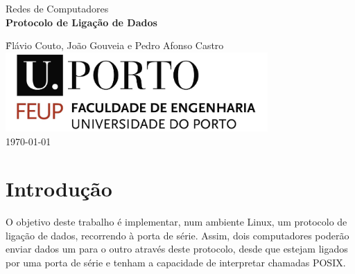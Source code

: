 \documentclass[11pt,a4paper,reqno]{article}
\numberwithin{equation}{section}
\begin{document}
\begin{titlepage}
\begin{center}
 
\vspace*{3cm}

{\Large Redes de Computadores}\\[2cm]

{\Huge \bfseries Protocolo de Liga\c{c}\~ao de Dados \\[1cm]}

{\large \^Flávio Couto, João Gouveia e Pedro Afonso Castro}\\[2cm]

\includegraphics[width=10cm]{feup_logo.jpg}\\[2cm]


{\large \today}

\end{center}
\end{titlepage}

\begin{abstract}
No âmbito da unidade curricular de Redes de Computadores, foi-nos proposta a elaboração de uma aplicação que permitia a transferência de dados entre dois computadores através da porta de série. Para tal, recorremos à implementação de duas camadas: a camada de ligação de dados e a camada da aplicação.

O nosso grupo soube compreender bem os objetivos propostos, tendo implementado com sucesso não só estes mesmos objetivos, como alguns elementos de valorização propostos pelos docentes, servindo este relatório para mostrar isso mesmo.
\end{abstract}

\tableofcontents

\section{Introdução}

O objetivo deste trabalho é implementar, num ambiente Linux, um protocolo de ligação de dados, recorrendo à porta de série. Assim, dois computadores poderão enviar dados um para o outro através deste protocolo, desde que estejam ligados por uma porta de série e tenham a capacidade de interpretar chamadas POSIX.
\end{document}
